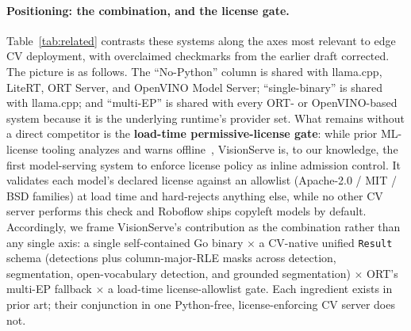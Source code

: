 \paragraph{Positioning: the combination, and the license gate.}
Table~\ref{tab:related} contrasts these systems along the axes most relevant
to edge CV deployment, with overclaimed checkmarks from the earlier draft
corrected. The picture is as follows.
The ``No-Python'' column is shared with llama.cpp, LiteRT, ORT Server, and
OpenVINO Model Server; ``single-binary'' is shared with llama.cpp; and
``multi-EP'' is shared with every ORT- or OpenVINO-based system because it
is the underlying runtime's provider set.
What remains without a direct competitor is the \textbf{load-time
permissive-license gate}: while prior ML-license tooling
analyzes and warns offline~\cite{duan2024modelgo,duan2026stolengpl,wang2026liagent},
VisionServe is, to our knowledge, the first model-serving system to enforce
license policy as inline admission control. It validates each model's declared license
against an allowlist (Apache-2.0 / MIT / BSD families) at load time and hard-rejects
anything else, while no other CV server performs this check and Roboflow ships copyleft
models by default.
Accordingly, we frame VisionServe's contribution as the combination
rather than any single axis: a single self-contained Go binary
$\times$ a CV-native unified \texttt{Result} schema (detections plus
column-major-RLE masks across detection, segmentation, open-vocabulary
detection, and grounded segmentation) $\times$ ORT's multi-EP fallback
$\times$ a load-time license-allowlist gate. Each ingredient exists in prior
art; their conjunction in one Python-free, license-enforcing CV server does
not.

